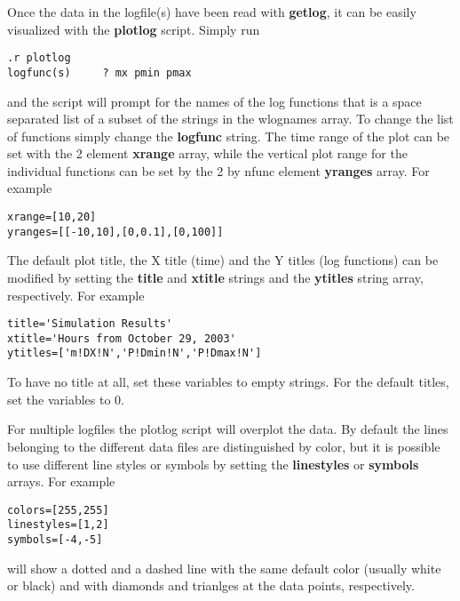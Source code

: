 Once the data in the logfile(s) have been read with {\bf getlog},
it can be easily visualized with the {\bf plotlog} script.
Simply run
\begin{verbatim}
.r plotlog
logfunc(s)     ? mx pmin pmax
\end{verbatim}
and the script will prompt for the names of the log functions that is
a space separated list of a subset of the strings in the wlognames array. 
To change the list of functions simply change the {\bf logfunc} string.
The time range of the plot can be set with the 2 element
{\bf xrange} array, while the vertical plot range for the individual functions 
can be set by the 2 by nfunc element {\bf yranges} array. For example
\begin{verbatim}
xrange=[10,20]
yranges=[[-10,10],[0,0.1],[0,100]]
\end{verbatim}
The default plot title, the X title (time) and the Y titles (log functions)
can be modified by setting the {\bf title} and {\bf xtitle} strings
and the {\bf ytitles} string array, respectively. For example
\begin{verbatim}
title='Simulation Results'
xtitle='Hours from October 29, 2003'
ytitles=['m!DX!N','P!Dmin!N','P!Dmax!N']
\end{verbatim}
To have no title at all, set these variables to empty strings.
For the default titles, set the variables to 0.

For multiple logfiles the plotlog script will overplot the data.
By default the lines belonging to the different data files are distinguished
by color, but it is possible to use different line styles or symbols
by setting the {\bf linestyles} or {\bf symbols} arrays. For example
\begin{verbatim}
colors=[255,255]
linestyles=[1,2]
symbols=[-4,-5]
\end{verbatim}
will show a dotted and a dashed line with the same default color
(usually white or black) and with diamonds and trianlges at
the data points, respectively.

